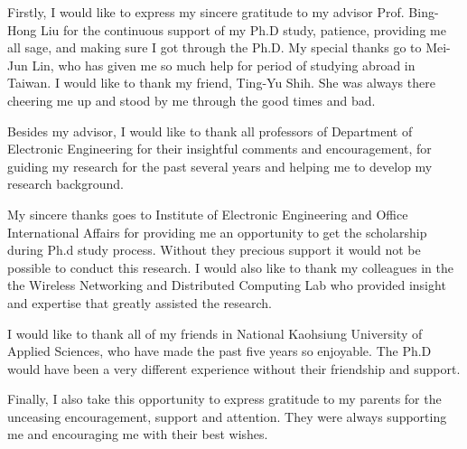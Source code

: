 
\begin{acknowledgements}

Firstly, I would like to express my sincere gratitude to my advisor Prof. Bing-Hong Liu for the continuous support of my
Ph.D study, patience, providing me all sage, and making sure I got through the Ph.D. My special thanks go to Mei-Jun Lin, who has given me so much help for period of studying abroad in Taiwan. I would like to thank my friend, Ting-Yu Shih. She was always there cheering me up and stood by me through the good times and bad.

Besides my advisor, I would like to thank all professors of Department of Electronic Engineering
for their insightful comments and encouragement, for guiding my research for the past several
years and helping me to develop my research background.

My sincere thanks goes to Institute of Electronic Engineering and Office International Affairs
for providing me an opportunity to get the scholarship during Ph.d study process.
Without they precious support it would not be possible to conduct this research.
I would also like to thank my colleagues in the the Wireless Networking and Distributed Computing Lab
who provided insight and expertise that greatly assisted the research.

I would like to thank all of my friends in National Kaohsiung University of Applied Sciences, who have made
the past five years so enjoyable. The Ph.D would have been a very different experience
without their friendship and support.

Finally, I also take this opportunity to express gratitude to my parents for the unceasing encouragement, support and attention. They were always supporting me and encouraging me with their best wishes.

\end{acknowledgements} 